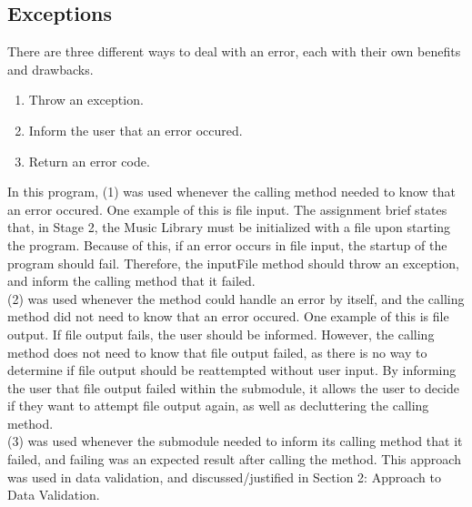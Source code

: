 \documentclass{article}
\begin{document}
	\subsection{Exceptions}
	There are three different ways to deal with an error, each with their own benefits and drawbacks.
	\begin{enumerate}
		\item Throw an exception.
		\item Inform the user that an error occured.
		\item Return an error code.
	\end{enumerate}
	In this program, (1) was used whenever the calling method needed to know that an error occured. One example of this is file input. The assignment brief states that, in Stage 2, the Music Library
		must be initialized with a file upon starting the program. Because of this, if an error occurs in file input, the startup of the program should fail. Therefore, the inputFile method should throw
		an exception, and inform the calling method that it failed.\\
	(2) was used whenever the method could handle an error by itself, and the calling method did not need to know that an error occured. One example of this is file output. If file output fails,
		the user should be informed. However, the calling method does not need to know that file output failed, as there is no way to determine if file output should be reattempted without user input.
		By informing the user that file output failed within the submodule, it allows the user to decide if they want to attempt file output again, as well as decluttering the calling method.\\
	(3) was used whenever the submodule needed to inform its calling method that it failed, and failing was an expected result after calling the method. This approach was used in data validation,
		and discussed/justified in Section 2: Approach to Data Validation.
\end{document}
